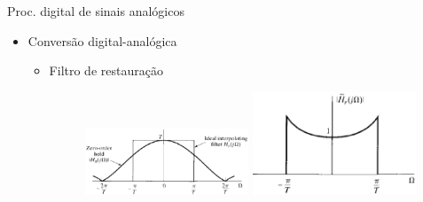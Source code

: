 \documentclass[
size=11pt,
paper=screen,
mode=present,
display=slidesnotes,
style=paintings,
nopagebreaks,
blackslide,
fleqn]{powerdot}
\begin{document}
\begin{slide}{Proc. digital de sinais anal\'ogicos}
\begin{itemize}
   \item Conversão digital-analógica
   \begin{itemize}
      \item Filtro de restauração 
      \begin{figure}
        \centering
         \includegraphics[width = 0.49\textwidth]{figs/da_conv1.eps}
        \includegraphics[width = 0.49\textwidth]{figs/da_conv2.eps}
      \end{figure}

   \end{itemize}
\end{itemize}
\end{slide}
\end{document}
